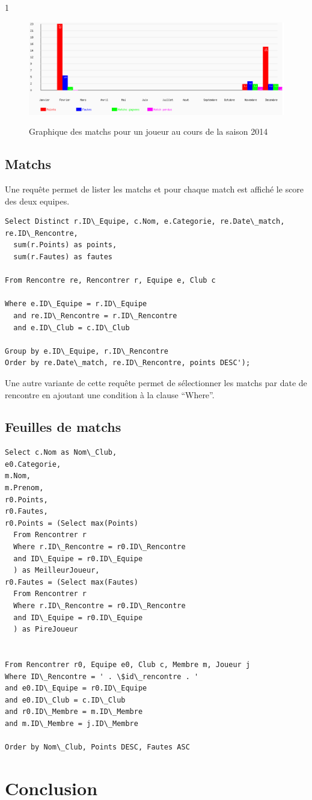 1\documentclass[a4paper»,8pt,french,fleqn]{report}
\begin{document}
\begin{figure}[h]
  \centering
    \includegraphics[scale=0.5]{graphe.png}
    \label{fig:graph}
    \caption{Graphique des matchs pour un joueur au cours de la saison 2014}
\end{figure}


\section{Matchs}
Une requête permet de lister les matchs et pour chaque match est affiché le score des deux equipes.

\begin{lstlisting}
Select Distinct r.ID\_Equipe, c.Nom, e.Categorie, re.Date\_match, re.ID\_Rencontre,
  sum(r.Points) as points, 
  sum(r.Fautes) as fautes 

From Rencontre re, Rencontrer r, Equipe e, Club c

Where e.ID\_Equipe = r.ID\_Equipe
  and re.ID\_Rencontre = r.ID\_Rencontre
  and e.ID\_Club = c.ID\_Club

Group by e.ID\_Equipe, r.ID\_Rencontre
Order by re.Date\_match, re.ID\_Rencontre, points DESC');
\end{lstlisting}

Une autre variante de cette requête permet de sélectionner les matchs par date de rencontre en ajoutant une condition à la clause ``Where''.


\section{Feuilles de matchs}

\begin{lstlisting}
Select c.Nom as Nom\_Club,
e0.Categorie,
m.Nom,
m.Prenom,
r0.Points,
r0.Fautes, 
r0.Points = (Select max(Points) 
  From Rencontrer r
  Where r.ID\_Rencontre = r0.ID\_Rencontre
  and ID\_Equipe = r0.ID\_Equipe
  ) as MeilleurJoueur,
r0.Fautes = (Select max(Fautes) 
  From Rencontrer r
  Where r.ID\_Rencontre = r0.ID\_Rencontre
  and ID\_Equipe = r0.ID\_Equipe
  ) as PireJoueur 
            

From Rencontrer r0, Equipe e0, Club c, Membre m, Joueur j
Where ID\_Rencontre = ' . \$id\_rencontre . '
and e0.ID\_Equipe = r0.ID\_Equipe
and e0.ID\_Club = c.ID\_Club
and r0.ID\_Membre = m.ID\_Membre
and m.ID\_Membre = j.ID\_Membre

Order by Nom\_Club, Points DESC, Fautes ASC
\end{lstlisting}

\chapter*{Conclusion}
\end{document}
